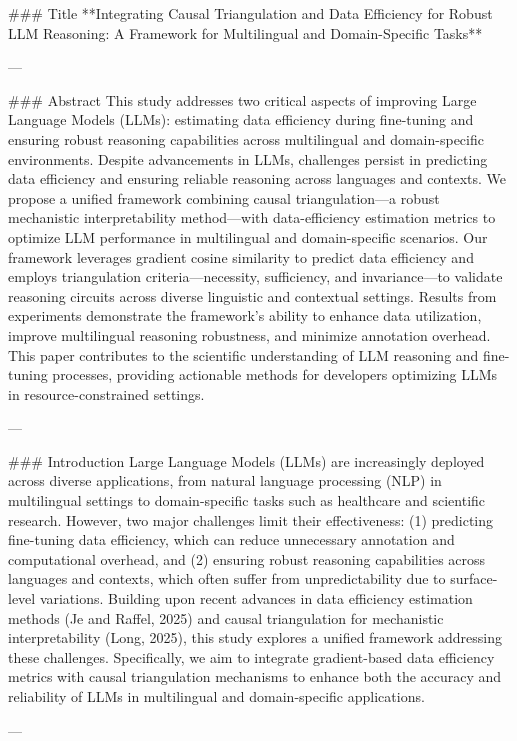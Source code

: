 ### Title  
**Integrating Causal Triangulation and Data Efficiency for Robust LLM Reasoning: A Framework for Multilingual and Domain-Specific Tasks**

---

### Abstract  
This study addresses two critical aspects of improving Large Language Models (LLMs): estimating data efficiency during fine-tuning and ensuring robust reasoning capabilities across multilingual and domain-specific environments. Despite advancements in LLMs, challenges persist in predicting data efficiency and ensuring reliable reasoning across languages and contexts. We propose a unified framework combining causal triangulation—a robust mechanistic interpretability method—with data-efficiency estimation metrics to optimize LLM performance in multilingual and domain-specific scenarios. Our framework leverages gradient cosine similarity to predict data efficiency and employs triangulation criteria—necessity, sufficiency, and invariance—to validate reasoning circuits across diverse linguistic and contextual settings. Results from experiments demonstrate the framework’s ability to enhance data utilization, improve multilingual reasoning robustness, and minimize annotation overhead. This paper contributes to the scientific understanding of LLM reasoning and fine-tuning processes, providing actionable methods for developers optimizing LLMs in resource-constrained settings.

---

### Introduction  
Large Language Models (LLMs) are increasingly deployed across diverse applications, from natural language processing (NLP) in multilingual settings to domain-specific tasks such as healthcare and scientific research. However, two major challenges limit their effectiveness: (1) predicting fine-tuning data efficiency, which can reduce unnecessary annotation and computational overhead, and (2) ensuring robust reasoning capabilities across languages and contexts, which often suffer from unpredictability due to surface-level variations. Building upon recent advances in data efficiency estimation methods (Je and Raffel, 2025) and causal triangulation for mechanistic interpretability (Long, 2025), this study explores a unified framework addressing these challenges. Specifically, we aim to integrate gradient-based data efficiency metrics with causal triangulation mechanisms to enhance both the accuracy and reliability of LLMs in multilingual and domain-specific applications.

---

